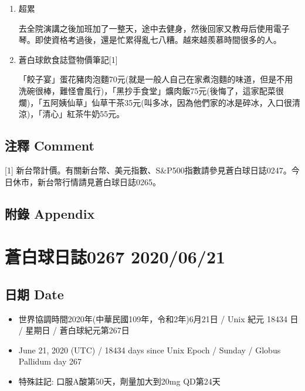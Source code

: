 \documentclass[
]{article}
\providecommand{\tightlist}{%
  \setlength{\itemsep}{0pt}\setlength{\parskip}{0pt}}
\begin{document}
\begin{enumerate}
\def\labelenumi{\arabic{enumi}.}
\item
  超累

  去全院演講之後加班加了一整天，途中去健身，然後回家又教母后使用電子琴。即使資格考過後，還是忙累得亂七八糟。越來越羨慕時間很多的人。
\item
  蒼白球飲食誌暨物價筆記{[}1{]}

  「餃子宴」蛋花豬肉泡麵70元(就是一般人自己在家煮泡麵的味道，但是不用洗碗很棒，難怪會風行)，「黑抄手食堂」爌肉飯75元(後悔了，這家配菜很爛)，「五阿姨仙草」仙草干茶35元(叫多冰，因為他們家的冰是碎冰，入口很清涼)，「清心」紅茶牛奶55元。
\end{enumerate}

\hypertarget{ux6ce8ux91cb-comment-17}{%
\subsection{注釋 Comment}\label{ux6ce8ux91cb-comment-17}}

{[}1{]}
新台幣計價。有關新台幣、美元指數、S\&P500指數請參見蒼白球日誌0247。今日休市，新台幣行情請見蒼白球日誌0265。

\hypertarget{ux9644ux9304-appendix-17}{%
\subsection{附錄 Appendix}\label{ux9644ux9304-appendix-17}}

\hypertarget{ux84bcux767dux7403ux65e5ux8a8c0267-20200621}{%
\section{蒼白球日誌0267
2020/06/21}\label{ux84bcux767dux7403ux65e5ux8a8c0267-20200621}}

\hypertarget{ux65e5ux671f-date-18}{%
\subsection{日期 Date}\label{ux65e5ux671f-date-18}}

\begin{itemize}
\tightlist
\item
  世界協調時間2020年(中華民國109年，令和2年)6月21日 / Unix 紀元 18434 日
  / 星期日 / 蒼白球紀元第267日
\item
  June 21, 2020 (UTC) / 18434 days since Unix Epoch / Sunday / Globus
  Pallidum day 267
\item
  特殊註記: 口服A酸第50天，劑量加大到20mg QD第24天
\end{itemize}
\end{document}
